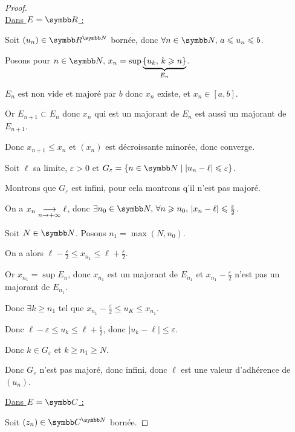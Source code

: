 \begin{proof}~\\
    \uline{Dans $E = \R$ :}

    Soit $(u_n) \in \R^{\N}$ bornée, donc $\forall n \in \N, \, a \leqslant u_n \leqslant b$. 

    Posons pour $n \in \N, \, x_n = \sup \underbrace{\{u_k, \, k \geqslant n\}}_{E_n}$.

    $E_n$ est non vide et majoré par $b$ donc $x_n$ existe, et $x_n \in [a, b]$.

    Or $E_{n + 1} \subset E_n$ donc $x_n$ qui est un majorant de $E_n$ est aussi un majorant de $E_{n + 1}$.

    Donc $x_{n + 1} \leqslant x_n$ et $(x_n)$ est décroissante minorée, donc converge. 

    Soit $\ell$ sa limite, $\varepsilon > 0$ et $G_\varepsilon = \{n \in \N \mid |u_n - \ell| \leqslant \varepsilon\}$.

    Montrons que $G_\varepsilon$ est infini, pour cela montrons q'il n'est pas majoré.

    On a $x_n \underset{n \to +\infty}{\longrightarrow} \ell$, donc $\exists n_0 \in \N, \, \forall n \geqslant n_0, \, |x_n - \ell| \leqslant \frac \varepsilon 2$.

    Soit $N \in \N$.
    Posons $n_1 = \max(N, n_0)$.

    On a alors $\ell - \frac \varepsilon 2 \leqslant x_{n_1} \leqslant \ell + \frac \varepsilon 2$.

    Or $x_{n_1} = \sup E_n$, donc $x_{n_1} $ est un majorant de $E_{n_1}$ et 
    $x_{n_1} - \frac \varepsilon 2$ n'est pas un majorant de $E_{n_1}$.

    Donc $\exists k \geqslant n_1$ tel que $x_{n_1} - \frac \varepsilon 2 \leqslant u_K \leqslant x_{n_1}$.
    
    Donc $\ell - \varepsilon \leqslant u_k \leqslant \ell + \frac \varepsilon 2$,
    donc $| u_k - \ell| \leqslant \varepsilon$. 

    Donc $k \in G_\varepsilon$ et $k \geqslant n_1 \geqslant N$.

    Donc $G_\varepsilon$ n'est pas majoré, donc infini, donc $\ell$ est une valeur d'adhérence de $(u_n)$. \\

    
    \uline{Dans $E = \C$ :}

    Soit $(z_n) \in \C^{\N}$ bornée. 


\end{proof}
